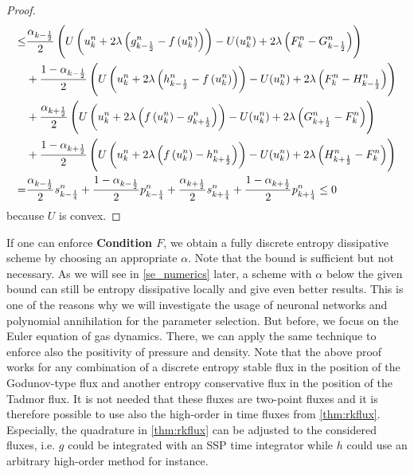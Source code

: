 \begin{proof}
\begin{equation}
\begin{aligned}
		\leq & \frac{\alpha_{k-\frac 1 2}}{2}\left(U \left(u^n_k + 2 \lambda \left(g^n_{k-\frac 1 2}-f\left (u^n_k \right) \right) \right) - U(u^n_k) + 2 \lambda  \left( F^n_{k} -G^n_{k-\frac 1 2} \right) \right) \\ 
		&+ \frac{1-\alpha_{k-\frac 1 2}}{2} \left(U\left (u^n_k + 2 \lambda \left(h^n_{k-\frac 1 2}-f\left (u^n_k \right) \right) \right)  -U(u^n_k) + 2 \lambda  \left(F^n_{k} - H^n_{k-\frac 1 2} \right) \right) \\
		&+ \frac{\alpha_{k+\frac 1 2}}{2}\left(U \left (u^n_k + 2 \lambda \left(f\left (u^n_k \right)-g^n_{k+\frac 1 2} \right) \right) - U(u^n_k) + 2 \lambda   \left(   G^n_{k+\frac 1 2} - F^n_{k}\right) \right) \\ 
		&+ \frac{1-\alpha_{k+\frac 1 2}}{2} \left(U\left (u^n_k + 2 \lambda \left(f\left (u^n_k \right)-h^n_{k+\frac 1 2} \right) \right) - U(u^n_k) + 2 \lambda  \left(  H^n_{k+\frac 1 2} - F^n_{k}\right) \right) \\
		=& \frac{\alpha_{k-\frac 1 2}}{2}s^n_{k-\frac 1 4} + \frac{1 - \alpha_{k - \frac 1 2}}{2} p^n_{k-\frac 1 4} + \frac{\alpha_{k+\frac 1 2}}{2}s^n_{k + \frac 1 4} + \frac{1-\alpha_{k+\frac 1 2}}{2} p^n_{k+\frac 1 4} \leq 0
	\end{aligned}
	\end{equation}
	because $U$ is convex.
\end{proof}
If one can enforce \textbf{Condition $F$}, we obtain a fully discrete entropy dissipative scheme by choosing an appropriate $\alpha$. Note that the bound is  sufficient but not necessary.  As we will see in \cref{se_numerics} later, a scheme with $\alpha$ below the given bound can still be entropy dissipative locally  and  give even  better results. This  is  one of the reasons why we will investigate the usage of neuronal networks and polynomial annihilation  for the parameter selection.
But before, we focus on the Euler equation of gas dynamics. There, we can apply the same technique to enforce also the positivity of pressure and density.
Note that the above proof works for any combination of a discrete entropy stable flux in the position of the Godunov-type flux and another entropy conservative flux in the position of the Tadmor flux. It is not needed that these fluxes are two-point fluxes and it is therefore possible to use also the high-order in time fluxes from  \cref{thm:rkflux}. Especially,  the quadrature in \cref{thm:rkflux} can be adjusted to the considered fluxes, i.e. $g$ could be integrated with an SSP time integrator while $h$ could use an arbitrary high-order method for instance. 



